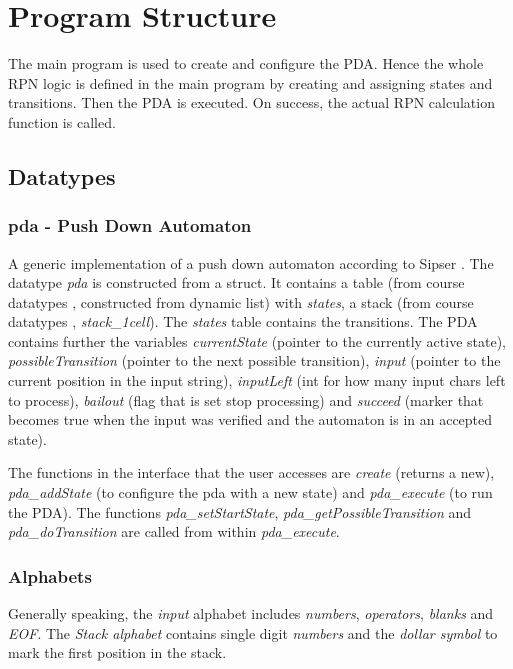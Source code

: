 \documentclass[a4paper,11pt,twoside]{article}
\begin{document}
\section{Program Structure}
The main program is used to create and configure the PDA. Hence the
whole RPN logic is defined in the main program by creating and
assigning states and transitions. Then the PDA is executed. On
success, the actual RPN calculation function is called.

\subsection{Datatypes}

\subsubsection{pda - Push Down Automaton}
A generic implementation of a push down automaton according to Sipser \cite[pp.112-125]{sipser2012}.
The datatype \textit{pda} is constructed from a struct. It contains a
table (from course datatypes \cite{datatypes}, constructed from
dynamic list) with \textit{states}, a stack (from course datatypes
\cite{datatypes}, \textit{stack\_1cell}). The \textit{states} table contains
the transitions. The PDA contains further the variables
\textit{currentState} (pointer to the currently active state),
\textit{possibleTransition} (pointer to the next possible transition),
\textit{input} (pointer to the current position in the input string), 
\textit{inputLeft} (int for how many input chars left to process),
\textit{bailout} (flag that is set stop processing) and
\textit{succeed} (marker that becomes true when the input was verified
and the automaton is in an accepted state).

The functions in the interface that the user accesses are \textit{create}
(returns a new), \textit{pda\_addState} (to configure the
pda with a new state) and \textit{pda\_execute} (to run the PDA). The
functions \textit{pda\_setStartState},
\textit{pda\_getPossibleTransition} and \textit{pda\_doTransition} are
called from within \textit{pda\_execute}. 


\subsubsection{Alphabets}
Generally speaking, the \textit{input} alphabet includes
\textit{numbers}, \textit{operators}, \textit{blanks} and
\textit{EOF}. The \textit{Stack alphabet} contains single digit
\textit{numbers} and the \textit{dollar symbol} to mark the first
position in the stack.   
\end{document}
